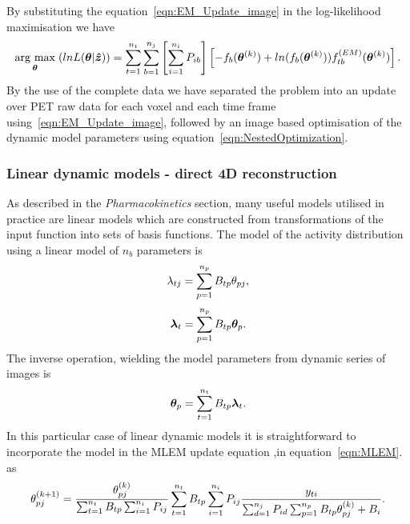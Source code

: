 By substituting the equation~\ref{eqn:EM_Update_image} in the log-likelihood maximisation we have
\begin{equation}
\underset{\bm{\theta}}{\operatorname{arg}\,\operatorname{max}}\;(lnL(\bm{\theta}|\bm{\hat{z}})) = 
\sum_{t=1}^{n_t} \sum_{b=1}^{n_j} \left[ \sum_{i=1}^{n_i}  P_{ib} \right]
\left[ -f_b(\bm\theta^{(k)}) + 
ln( f_b(\bm\theta^{(k)})) 
f_{tb}^{(EM)}(\bm{\theta}^{(k)})
\right] \\ .
\label{eqn:NestedOptimization}
\end{equation}
By the use of the complete data we have separated the problem into an update over PET raw data for each voxel and each time frame using~\ref{eqn:EM_Update_image}, followed by an image based optimisation of the dynamic model parameters using equation~\ref{eqn:NestedOptimization}. 

\subsubsection{Linear dynamic models - direct 4D reconstruction}
As described in the \textit{Pharmacokinetics} section, many useful models utilised in practice are linear models which are constructed from transformations of the input function into sets of basis functions.
The model of the activity distribution using a linear model of $n_b$ parameters is
\begin{equation}
\lambda_{tj} = \sum_{p=1}^{n_p} B_{tp}   \theta_{pj} \\, 
\end{equation}
\begin{equation}
\bm\lambda_{t} = \sum_{p=1}^{n_p} B_{tp}  \bm\theta_{p}  \\.
\end{equation}
The inverse operation, wielding the model parameters from dynamic series of images is
\begin{equation}
\bm\theta_{p}  = \sum_{t=1}^{n_t} B_{tp} \bm\lambda_{t}  \\.
\end{equation}
In this particular case of linear dynamic models it is straightforward to incorporate the model in the MLEM update equation ,in equation~\ref{eqn:MLEM}. as
%
%
%
\begin{equation}
\theta_{pj}^{(k+1)} = \frac{\theta_{pj}^{(k)}}
{\sum_{t=1}^{n_t} B_{tp} \sum_{i=1}^{n_i} P_{ij}} 
\sum_{t=1}^{n_t} B_{tp} \sum_{i=1}^{n_i} P_{ij}
\frac{y_{ti}}
{\sum_{d=1}^{n_j} P_{id} \sum_{p=1}^{n_p} B_{tp}\theta_{pj}^{(k)} + B_i } \\.
\label{eqn:4DMLEM}
\end{equation} 
%
%
%
